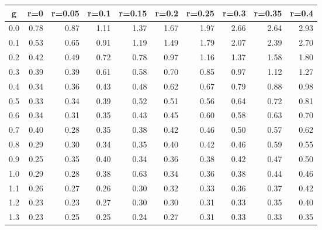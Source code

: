 %
\begin{table}[!tbp]
 \begin{center}
 \begin{tabular}{rrrrrrrrrr}\hline\hline
\multicolumn{1}{c}{g}&\multicolumn{1}{c}{r=0}&\multicolumn{1}{c}{r=0.05}&\multicolumn{1}{c}{r=0.1}&\multicolumn{1}{c}{r=0.15}&\multicolumn{1}{c}{r=0.2}&\multicolumn{1}{c}{r=0.25}&\multicolumn{1}{c}{r=0.3}&\multicolumn{1}{c}{r=0.35}&\multicolumn{1}{c}{r=0.4}\tabularnewline
\hline
0.0&0.78&0.87&1.11&1.37&1.67&1.97&2.66&2.64&2.93\tabularnewline
0.1&0.53&0.65&0.91&1.19&1.49&1.79&2.07&2.39&2.70\tabularnewline
0.2&0.42&0.49&0.72&0.78&0.97&1.16&1.37&1.58&1.80\tabularnewline
0.3&0.39&0.39&0.61&0.58&0.70&0.85&0.97&1.12&1.27\tabularnewline
0.4&0.34&0.36&0.43&0.48&0.62&0.67&0.79&0.88&0.98\tabularnewline
0.5&0.33&0.34&0.39&0.52&0.51&0.56&0.64&0.72&0.81\tabularnewline
0.6&0.34&0.31&0.35&0.43&0.45&0.60&0.58&0.63&0.70\tabularnewline
0.7&0.40&0.28&0.35&0.38&0.42&0.46&0.50&0.57&0.62\tabularnewline
0.8&0.29&0.30&0.34&0.35&0.40&0.42&0.46&0.59&0.55\tabularnewline
0.9&0.25&0.35&0.40&0.34&0.36&0.38&0.42&0.47&0.50\tabularnewline
1.0&0.29&0.28&0.38&0.63&0.34&0.36&0.38&0.44&0.46\tabularnewline
1.1&0.26&0.27&0.26&0.30&0.32&0.33&0.36&0.37&0.42\tabularnewline
1.2&0.23&0.23&0.27&0.30&0.30&0.31&0.33&0.35&0.40\tabularnewline
1.3&0.23&0.25&0.25&0.24&0.27&0.31&0.33&0.33&0.35\tabularnewline
\hline
\end{tabular}

\end{center}

\end{table}

